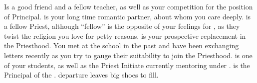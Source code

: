 \documentclass[char]{GL2020}
\begin{document}
\begin{itemz}[Notes]
	\item 
\end{itemz}

\begin{contacts}
	\contact{\cMusic{}} Is a good friend and a fellow teacher, as well as your competition for the position of Principal.
	\contact{\cJuniorStatesman{}} is your long time romantic partner, about whom you care deeply.
	\contact{\cAntiChup{}} is a fellow Priest, although “fellow” is the opposite of your feelings for \cAntiChup{\them}, as they twist the religion you love for petty reasons.
	\contact{\cHeadScientist{}} is your prospective replacement in the Priesthood. You met at the school in the past and have been exchanging letters recently as you try to gauge their suitability to join the Priesthood.
	\contact{\cScholarship{}} is one of your students, as well as the Priest Initiate currently mentoring under \cAntiChup{}.  
	\contact{\cPrincipal{}} is the Principal of the \pSchool{}. \cPrincipal{\their} departure leaves big shoes to fill.
\end{contacts}
\end{document}
